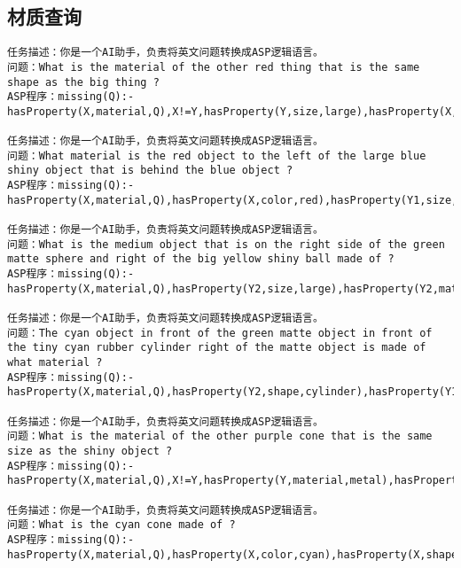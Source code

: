 \subsection{材质查询}
\begin{lstlisting}
任务描述：你是一个AI助手，负责将英文问题转换成ASP逻辑语言。
问题：What is the material of the other red thing that is the same shape as the big thing ? 
ASP程序：missing(Q):-hasProperty(X,material,Q),X!=Y,hasProperty(Y,size,large),hasProperty(X,color,red),same_shape(Y,X). 

任务描述：你是一个AI助手，负责将英文问题转换成ASP逻辑语言。
问题：What material is the red object to the left of the large blue shiny object that is behind the blue object ? 
ASP程序：missing(Q):-hasProperty(X,material,Q),hasProperty(X,color,red),hasProperty(Y1,size,large),hasProperty(Y2,color,blue),hasProperty(Y1,material,metal),hasProperty(Y1,color,blue),left(Y1,X),behind(Y2,Y1),X!=Y1,Y1!=Y2,X!=Y2. 

任务描述：你是一个AI助手，负责将英文问题转换成ASP逻辑语言。
问题：What is the medium object that is on the right side of the green matte sphere and right of the big yellow shiny ball made of ? 
ASP程序：missing(Q):-hasProperty(X,material,Q),hasProperty(Y2,size,large),hasProperty(Y2,material,metal),hasProperty(Y2,color,yellow),hasProperty(Y1,shape,sphere),hasProperty(Y1,color,green),hasProperty(Y2,shape,sphere),hasProperty(Y1,material,rubber),hasProperty(X,size,medium),right(Y1,X),right(Y2,X),X!=Y1,Y1!=Y2,X!=Y2. 

任务描述：你是一个AI助手，负责将英文问题转换成ASP逻辑语言。
问题：The cyan object in front of the green matte object in front of the tiny cyan rubber cylinder right of the matte object is made of what material ? 
ASP程序：missing(Q):-hasProperty(X,material,Q),hasProperty(Y2,shape,cylinder),hasProperty(Y1,material,rubber),hasProperty(Y2,material,rubber),hasProperty(X,color,cyan),hasProperty(Y2,size,small),hasProperty(Y1,color,green),hasProperty(Y2,color,cyan),hasProperty(Y3,material,rubber),front(Y1,X),front(Y2,Y1),right(Y3,Y2),X!=Y1,Y1!=Y2,Y2!=Y3,X!=Y2,X!=Y3,Y1!=Y3. 

任务描述：你是一个AI助手，负责将英文问题转换成ASP逻辑语言。
问题：What is the material of the other purple cone that is the same size as the shiny object ? 
ASP程序：missing(Q):-hasProperty(X,material,Q),X!=Y,hasProperty(Y,material,metal),hasProperty(X,shape,cone),hasProperty(X,color,purple),same_size(Y,X). 

任务描述：你是一个AI助手，负责将英文问题转换成ASP逻辑语言。
问题：What is the cyan cone made of ? 
ASP程序：missing(Q):-hasProperty(X,material,Q),hasProperty(X,color,cyan),hasProperty(X,shape,cone). 


\end{lstlisting}
